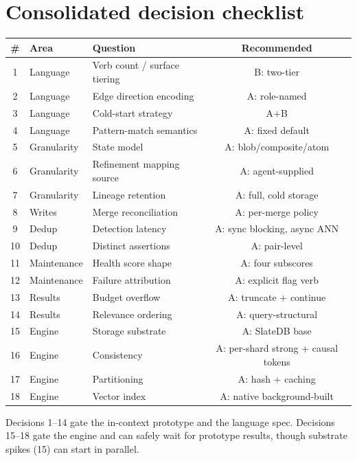 \documentclass[11pt]{article}
\begin{document}
\section{Consolidated decision checklist}

\begin{center}
\small
\begin{tabular}{clp{6.6cm}c}
\toprule
\# & Area & Question & Recommended \\
\midrule
1 & Language & Verb count / surface tiering & B: two-tier \\
2 & Language & Edge direction encoding & A: role-named \\
3 & Language & Cold-start strategy & A+B \\
4 & Language & Pattern-match semantics & A: fixed default \\
5 & Granularity & State model & A: blob/composite/atom \\
6 & Granularity & Refinement mapping source & A: agent-supplied \\
7 & Granularity & Lineage retention & A: full, cold storage \\
8 & Writes & Merge reconciliation & A: per-merge policy \\
9 & Dedup & Detection latency & A: sync blocking, async ANN \\
10 & Dedup & Distinct assertions & A: pair-level \\
11 & Maintenance & Health score shape & A: four subscores \\
12 & Maintenance & Failure attribution & A: explicit flag verb \\
13 & Results & Budget overflow & A: truncate + continue \\
14 & Results & Relevance ordering & A: query-structural \\
15 & Engine & Storage substrate & A: SlateDB base \\
16 & Engine & Consistency & A: per-shard strong + causal tokens \\
17 & Engine & Partitioning & A: hash + caching \\
18 & Engine & Vector index & A: native background-built \\
\bottomrule
\end{tabular}
\end{center}

Decisions 1--14 gate the in-context prototype and the language spec. Decisions 15--18 gate the engine and can safely wait for prototype results, though substrate spikes (15) can start in parallel.
\end{document}
